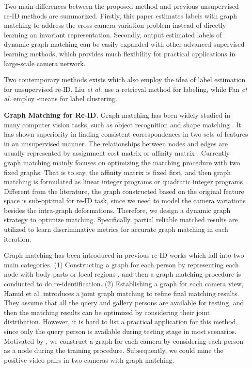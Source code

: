 \documentclass[10pt,twocolumn,letterpaper]{article}
\begin{document}
Two main differences between the proposed method and previous unsupervised re-ID methods are summarized. Firstly, this paper estimates labels with graph matching to address the cross-camera variation problem instead of directly learning an invariant representation.  Secondly, output estimated labels of dynamic graph matching can be easily expanded with other advanced supervised learning methods, which provides much flexibility for practical applications in large-scale camera network.

Two contemporary methods exists \cite{iccv17labeling,fan2017unsupervised} which also employ the idea of label estimation for unsupervised re-ID. Liu \emph{et al.} \cite{iccv17labeling} use a retrieval method for labeling, while Fan \emph{et al.} \cite{fan2017unsupervised} employ -means for label clustering.




\textbf{Graph Matching for Re-ID.}
Graph matching has been widely studied in many computer vision tasks, such as object recognition and shape matching \cite{pami16gm}. It has shown superiority in finding consistent correspondences in two sets of features in an unsupervised manner. The relationships between nodes and edges are usually represented by assignment cost matrix \cite{ijcv12gm,iccv15joint} or affinity matrix \cite{cho10rrwm,pami16gm}. Currently graph matching mainly focuses on optimizing the matching procedure with two fixed graphs. That is to say, the affinity matrix is fixed first, and then graph matching is formulated as linear integer programs \cite{iccv15joint} or quadratic integer programs \cite{ijcv12gm}. Different from the literature, the graph constructed based on the original feature space is sub-optimal for re-ID task, since we need to model the camera variations besides the intra-graph deformations. Therefore, we design a dynamic graph strategy to optimize matching. Specifically, partial reliable matched results are utilized to learn discriminative metrics for accurate graph matching in each iteration.


Graph matching has been introduced in previous re-ID works which fall into two main categories. (1) Constructing a graph for each person by representing each node with body parts \cite{iccv13gm} or local regions \cite{tcsvt16gm}, and then a graph matching procedure is conducted to do re-identification. (2) Establishing a graph for each camera view, Hamid et al. \cite{cvpr16graph} introduces a joint graph matching to refine final matching results. They assume that all the query and gallery persons are available for testing, and then the matching results can be optimized by considering their joint distribution. However, it is hard to list a practical application for this method, since only the query person is available during testing stage in most scenarios. Motivated by \cite{cvpr16graph}, we construct a graph for each camera by considering each person as a node during the training procedure. Subsequently, we could mine the positive video pairs in two cameras with graph matching.
\end{document}
